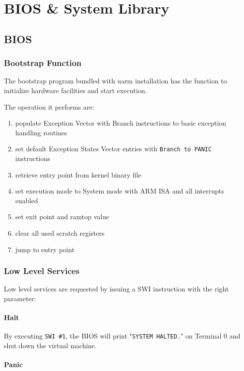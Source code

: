 \chapter{BIOS \& System Library}

\section{BIOS}

\subsection{Bootstrap Function}

The bootstrap program bundled with uarm installation has the function to initialize hardware facilities and start execution.

The operation it performs are:

\begin{enumerate}
\item populate Exception Vector with Branch instructions to basic exception handling routines
\item set default Exception States Vector entries with \texttt{Branch to PANIC} instructions
\item retrieve entry point from kernel binary file
\item set execution mode to System mode with ARM ISA and all interrupts enabled
\item set exit point and ramtop value
\item clear all used scratch registers
\item jump to entry point
\end{enumerate}

\subsection{Low Level Services}

Low level services are requested by issuing a SWI instruction with the right parameter:

\subsubsection{Halt}

By executing \texttt{SWI \#1}, the BIOS will print "\texttt{SYSTEM HALTED.}" on Terminal 0 and shut down the virtual machine.

\subsubsection{Panic}

